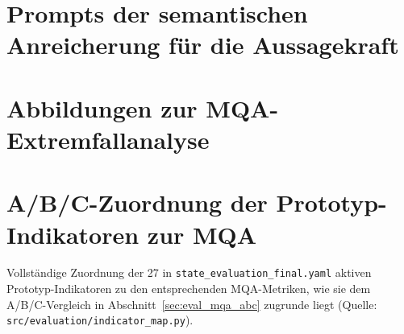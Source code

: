 \documentclass[german]{htwg-report}
\begin{document}
\chapter{Prompts der semantischen Anreicherung für die Aussagekraft}
\label{app:prompts_semantische_anreicherung}


\chapter{Abbildungen zur MQA-Extremfallanalyse}
\label{app:mqa_extremfaelle_abbildungen}


\chapter{A/B/C-Zuordnung der Prototyp-Indikatoren zur MQA}
\label{app:mqa_abc_mapping}

Vollständige Zuordnung der 27 in \texttt{state\_evaluation\_final.yaml} aktiven
Prototyp-Indikatoren zu den entsprechenden MQA-Metriken, wie sie dem
A/B/C-Vergleich in Abschnitt~\ref{sec:eval_mqa_abc} zugrunde liegt (Quelle:
\texttt{src/evaluation/indicator\_map.py}).


\end{document}
